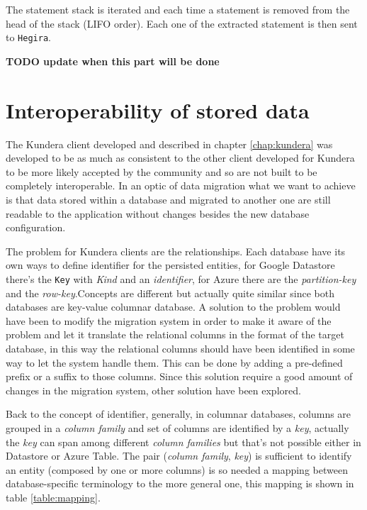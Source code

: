 \noindent The statement stack is iterated and each time a statement is removed from the head of the stack (LIFO order). Each one of the extracted statement is then sent to \texttt{Hegira}.

\newparagraph \textbf{TODO update when this part will be done}

\section{Interoperability of stored data}
The Kundera client developed and described in chapter \ref{chap:kundera} was developed to be as much as consistent to the other client developed for Kundera to be more likely accepted by the community and so are not built to be completely interoperable.
In an optic of data migration what we want to achieve is that data stored within a database and migrated to another one are still readable to the application without changes besides the new database configuration. 

\noindent The problem for Kundera clients are the relationships. Each database have its own ways to define identifier for the persisted entities, for Google Datastore there's the \texttt{Key} with \textit{Kind} and an \textit{identifier}, for Azure there are the \textit{partition-key} and the \textit{row-key}.Concepts are different but actually quite similar since both databases are key-value columnar database. 
A solution to the problem would have been to modify the migration system in order to make it aware of the problem and let it translate the relational columns in the format of the target database, in this way the relational columns should have been identified in some way to let the system handle them. This can be done by adding a pre-defined prefix or a suffix to those columns.
Since this solution require a good amount of changes in the migration system, other solution have been explored.
 
\newparagraph Back to the concept of identifier, generally, in columnar databases, columns are grouped in a \textit{column family} and set of columns are identified by a \textit{key}, actually the \textit{key} can span among different \textit{column families} but that's not possible either in Datastore or Azure Table.
The pair (\textit{column family}, \textit{key}) is sufficient to identify an entity (composed by one or more columns) is so needed a mapping between database-specific terminology to the more general one, this mapping is shown in table \ref{table:mapping}.

